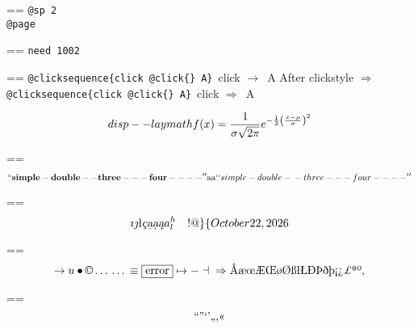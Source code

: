 \documentclass{book}
\makeatletter
\newenvironment{Texinfopreformatted}{%
  \par\GNUTobeylines\obeyspaces\frenchspacing\parskip=\z@\parindent=\z@}{}
{\catcode`\^^M=13 \gdef\GNUTobeylines{\catcode`\^^M=13 \def^^M{\null\par}}}
\newenvironment{Texinfoindented}{\begin{list}{}{}\item\relax}{\end{list}}
\renewcommand{\_}{\Texinfounderscore\discretionary{}{}{}}
\makeatother
\begin{document}
\begin{Texinfoindented}
\begin{Texinfopreformatted}
\texttt{@sp 2}\leavevmode{}\\
\baselineskip %
\texttt{@page}\leavevmode{}\\
\end{Texinfopreformatted}
\newpage{}%
\phantom{blabla}%
\begin{Texinfopreformatted}%
\ttfamily 
\texttt{need 1002}
\end{Texinfopreformatted}
\needspace{1.002pt}%
\begin{Texinfopreformatted}%
\ttfamily 
\texttt{@clicksequence\{click @click\{\}\ A\}}\ click $\rightarrow{}$\ A
After clickstyle $\Rightarrow{}$
\texttt{@clicksequence\{click @click\{\}\ A\}}\ click $\Rightarrow{}$\ A


\end{Texinfopreformatted}
\[
disp--laymath
f(x) = {1 \over \sigma \sqrt{2\pi}}e^{-{1 \over 2}\left({x-\mu \over \sigma}\right)^2}
\]
\begin{Texinfopreformatted}%
\ttfamily 
\end{Texinfopreformatted}
\[
\mathbf{``simple-double--three---four----''} \hbox{aa}
`\hbox{}`simple-double-\hbox{}-three---four----'\hbox{}'
\]
\begin{Texinfopreformatted}%
\ttfamily 
\end{Texinfopreformatted}
\[
\imath{} \jmath{}
\mathord{\text{\l{}}} \textsl{\c{c}}
\textsl{\b{a}} \textsl{\d{a}} \textsl{\k{a}} a^{h}_{l}
 \ {}\ {} \ {}\-{}  ! @ \} \{ 
\today{}
\]
\begin{Texinfopreformatted}%
\ttfamily 
\end{Texinfopreformatted}
\[
\rightarrow{}
u
\bullet{} \copyright{} \dots{} \dots{} \equiv{}
\fbox{error} \mapsto{} - \dashv{} \Rightarrow{}
\mathord{\text{\AA{}}} \mathord{\text{\ae{}}} \mathord{\text{\oe{}}} \mathord{\text{\AE{}}} \mathord{\text{\OE{}}} \mathord{\text{\o{}}} \mathord{\text{\O{}}} \mathord{\text{\ss{}}} \mathord{\text{\l{}}} \mathord{\text{\L{}}} \mathord{\text{\DH{}}}
\mathord{\text{\TH{}}} \mathord{\text{\dh{}}} \mathord{\text{\th{}}} \mathord{\text{\textexclamdown{}}} \mathord{\text{\textquestiondown{}}} \mathsterling{}
\mathord{\text{\textordfeminine{}}} \mathord{\text{\textordmasculine{}}} , 
\]
\begin{Texinfopreformatted}%
\ttfamily 
\end{Texinfopreformatted}
\[
\mathord{\text{\textquotedblleft{}}} \mathord{\text{\textquotedblright{}}} 
\mathord{\text{\textquoteleft{}}} \mathord{\text{\textquoteright{}}} \mathord{\text{\quotedblbase{}}} \mathord{\text{\quotesinglbase{}}} \mathord{\text{\guillemotleft{}}}
\]
\end{Texinfoindented}
\end{document}
